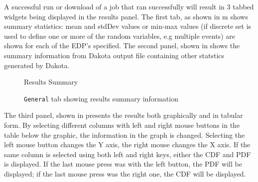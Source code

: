 A successful run or download of a job that ran successfully will result in 3 tabbed
widgets being displayed in the results panel.  The first tab, as shown in
m shows summary statistics: mean and
stdDev values or min-max values (if discrete set is used to define one or more of the random variables, e.g multiple events)
are shown for each of the EDP's specified. The second panel,
shown in  shows the summary
information from Dakota output file containing other statstics generated by Dakota.

\begin{figure}[!htbp]
  \caption{Results Summary}
  \label{fig:results_summary}
\end{figure}

\begin{figure}[!htbp]
  \caption{\texttt{General} tab showing results summary information}
  \label{fig:summary_information}
\end{figure}

The third panel, shown in  presents the results both
graphically and in tabular form. By selecting different
columns with left and right mouse buttons in the table below the
graphic, the information in the graph is changed. Selecting the left
mouse button changes the Y axis, the right mouse changes the X
axis. If the same column is selected using both left and right keys,
either the CDF and PDF is displayed. If the last mouse press was with the left
button, the PDF will be displayed; if the last mouse press was the right one, the CDF
will be displayed.
 
